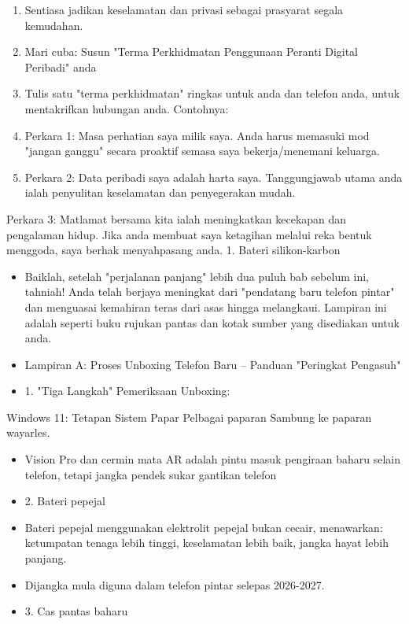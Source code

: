 \begin{enumerate}
  \item Sentiasa jadikan keselamatan dan privasi sebagai prasyarat segala kemudahan.
  \item Mari cuba: Susun "Terma Perkhidmatan Penggunaan Peranti Digital Peribadi" anda
  \item Tulis satu "terma perkhidmatan" ringkas untuk anda dan telefon anda, untuk mentakrifkan hubungan anda. Contohnya:
  \item Perkara 1: Masa perhatian saya milik saya. Anda harus memasuki mod "jangan ganggu" secara proaktif semasa saya bekerja/menemani keluarga.
  \item Perkara 2: Data peribadi saya adalah harta saya. Tanggungjawab utama anda ialah penyulitan keselamatan dan penyegerakan mudah.
\end{enumerate}

\begin{tcbpractice}{Perkara 3: Matlamat bersama kita ialah meningkatkan kecekapan dan pengalaman hidup. Jika anda membuat saya ketagihan melalui reka bentuk menggoda, saya berhak menyahpasang anda.}
1. Bateri silikon-karbon

\begin{itemize}
  \item Baiklah, setelah "perjalanan panjang" lebih dua puluh bab sebelum ini, tahniah! Anda telah berjaya meningkat dari "pendatang baru telefon pintar" dan menguasai kemahiran teras dari asas hingga melangkaui. Lampiran ini adalah seperti buku rujukan pantas dan kotak sumber yang disediakan untuk anda.
  \item Lampiran A: Proses Unboxing Telefon Baru – Panduan "Peringkat Pengasuh"
  \item 1. "Tiga Langkah" Pemeriksaan Unboxing:
\end{itemize}

\end{tcbpractice}

\begin{tcbsummary}{Windows 11: Tetapan Sistem Papar Pelbagai paparan Sambung ke paparan wayarles.}
\begin{itemize}
  \item Vision Pro dan cermin mata AR adalah pintu masuk pengiraan baharu selain telefon, tetapi jangka pendek sukar gantikan telefon
  \item 2. Bateri pepejal
  \item Bateri pepejal menggunakan elektrolit pepejal bukan cecair, menawarkan: ketumpatan tenaga lebih tinggi, keselamatan lebih baik, jangka hayat lebih panjang.
  \item Dijangka mula diguna dalam telefon pintar selepas 2026-2027.
  \item 3. Cas pantas baharu
\end{itemize}

\end{tcbsummary}
